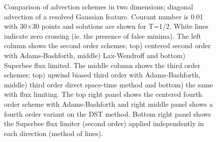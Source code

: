 \begin{figure}
\caption{
Comparison of advection schemes in two dimensions; diagonal advection
of a resolved Gaussian feature. Courant number is 0.01 with
30$\times$30 points and solutions are shown for T=1/2. White lines
indicate zero crossing (ie. the presence of false minima).  The left
column shows the second order schemes; top) centered second order with
Adams-Bashforth, middle) Lax-Wendroff and bottom) Superbee flux
limited. The middle column shows the third order schemes; top) upwind
biased third order with Adams-Bashforth, middle) third order direct
space-time method and bottom) the same with flux limiting. The top
right panel shows the centered fourth order scheme with
Adams-Bashforth and right middle panel shows a fourth order variant on
the DST method. Bottom right panel shows the Superbee flux limiter
(second order) applied independently in each direction (method of
lines).
\label{fig:advect-2d-lo-diag}
}
\end{figure}

